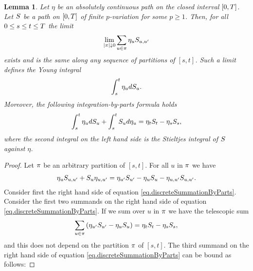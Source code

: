 \documentclass[10pt,a4paper]{article}
\newtheorem{lemma}[thm]{Lemma}
\begin{document}
\begin{appendices}
\begin{lemma}
	\label{lemma.integrationByPartsYoungIntegral}
	Let $\eta$ be an absolutely continuous path on the closed interval ${[0,T]}$. Let $S$ be a path on ${[0,T]}$ of finite $p$-variation for some $p\geq 1$. Then, for all $0\leq s \leq t \leq T$  the limit 
	\begin{equation*}\label{eq.definitionOfYoungIntegral}
	 \lim_{\left\lvert {\pi} \right\rvert\downarrow 0 } \sum_{u\in\pi} \eta_{u} S_{u,u^{\prime}}
	\end{equation*}
	exists  and is the same along any sequence of partitions of $[s,t]$. Such a limit defines the Young integral 
	\begin{equation*}
	\int_{s}^{t} \eta_u dS_u .
	\end{equation*}
	 Moreover, the following integration-by-parts formula holds 
	 \begin{equation*}
	 \int_{s}^{t} \eta_u dS_u  + \int_{s}^{t} S_u d\eta_u = \eta_t S_t - \eta_sS_s,  
	 \end{equation*}
	 where the second integral on the left hand side is the Stieltjes integral of $S$ against $\eta$. 
\end{lemma}
\begin{proof}
	Let $\pi$ be an arbitrary partition of $[s,t]$. For all $u$ in $\pi$ we have 
	\begin{equation}\label{eq.discreteSummationByParts}
	\eta_u S_{u,u^{\prime}} + S_{u}\eta_{u,u^{\prime}}
	= \eta_{u^{\prime}}S_{u^{\prime}} - \eta_{u}S_{u} - \eta_{u,u^{\prime}} S_{u,u^{\prime}}. 
	\end{equation}
	Consider first the right hand side of equation \eqref{eq.discreteSummationByParts}. Consider the first two summands on the right hand side of   equation \eqref{eq.discreteSummationByParts}. If we sum over $u$ in $\pi$ we have the telescopic sum 
	\begin{equation*}
	\sum_{u\in\pi} \left(\eta_{u^{\prime}}S_{u^{\prime}} - \eta_u S_u\right) = \eta_tS_t - \eta_s S_s,
	\end{equation*}
	and this does not depend on the partition $\pi$ of $[s,t]$. 
	The third summand on the right hand side of   equation \eqref{eq.discreteSummationByParts} can be bound as follows:

\end{proof}
\end{appendices}
\end{document}
